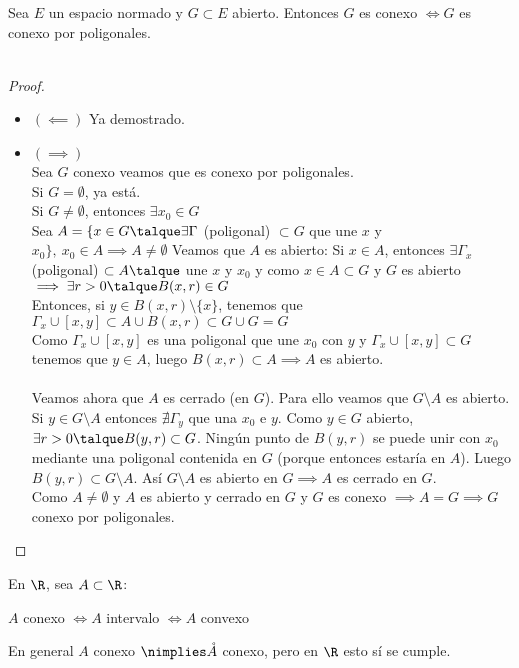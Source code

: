 	\begin{proposicion} Sea $E$ un espacio normado y $G\subset E$ abierto. Entonces $G$ es conexo $\iff G$ es conexo por poligonales. \\\\
	\begin{proof}\ 
	\begin{itemize}
		\item $(\impliedby)$ Ya demostrado.
		\item $(\implies)$\\
		Sea $G$ conexo veamos que es conexo por poligonales.\\
		Si $G=\emptyset$, ya está.\\
		Si $G\neq\emptyset$, entonces $\exists x_0\in G$\\
		Sea $A=\{x\in G\talque \exists \Gamma$ (poligonal) $\subset G$ que une $x$ y $x_0\},\ x_0\in A\implies A\neq\emptyset$
		Veamos que $A$ es abierto: Si $x\in A$, entonces $\exists \Gamma_x$ (poligonal) $\subset A\talque$ une $x$ y $x_0$ y como $x\in A\subset G$ y $G$ es abierto$\implies \exists r>0\talque B(x,r)\in G$\\
		Entonces, si $y\in B(x,r)\setminus\{x\}$, tenemos que $\Gamma_x\cup[x,y]\subset A\cup B(x,r)\subset G\cup G=G$\\
		Como $\Gamma_x\cup[x,y]$ es una poligonal que une $x_0$ con $y$ y $\Gamma_x\cup[x,y]\subset G$ tenemos que $y\in A$, luego $B(x,r)\subset A\implies A$ es abierto.\\\\
			Veamos ahora que $A$ es cerrado (en $G$).
		Para ello veamos que $G\setminus A$ es abierto. Si $y\in G\setminus A$ entonces $\nexists \Gamma_y$ que una $x_0$ e $y$. Como $y\in G$ abierto, $\exists r >0\talque B(y,r)\subset G$. Ningún punto de $B(y,r)$ se puede unir con $x_0$ mediante una poligonal contenida en $G$ (porque entonces estaría en $A$). Luego $B(y,r)\subset G\setminus A$. Así $G\setminus A$ es abierto en $G\implies A$ es cerrado en $G$.\\
		Como $A\neq\emptyset$ y $A$ es abierto y cerrado en $G$ y $G$ es conexo $\implies A=G \implies G$ conexo por poligonales.
 	\end{itemize}
	\end{proof}
	\end{proposicion}
	
	\begin{observacion} En $\R$, sea $A\subset \R$:
	\begin{center}
	$A$ conexo $\iff A$ intervalo $\iff A$ convexo
	\end{center}
	En general $A$ conexo $\nimplies \mathring{A}$ conexo, pero en $\R$ esto sí se cumple.
	\end{observacion}